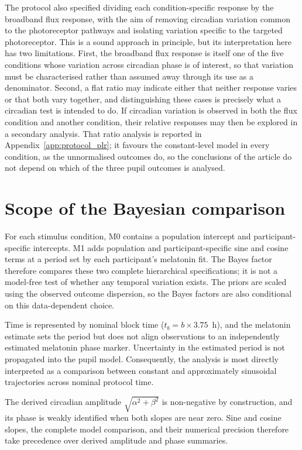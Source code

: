 \begin{appendixbox}
The protocol also specified dividing each condition-specific response by the broadband flux response, with the aim of removing circadian variation common to the photoreceptor pathways and isolating variation specific to the targeted photoreceptor. This is a sound approach in principle, but its interpretation here has two limitations.
First, the broadband flux response is itself one of the five conditions whose variation across circadian phase is of interest, so that variation must be characterised rather than assumed away through its use as a denominator.
Second, a flat ratio may indicate either that neither response varies or that both vary together, and distinguishing these cases is precisely what a circadian test is intended to do.
If circadian variation is observed in both the flux condition and another condition, their relative responses may then be explored in a secondary analysis. That ratio analysis is reported in Appendix~\ref{app:protocol_plr}; it favours the constant-level model in every condition, as the unnormalised outcomes do, so the conclusions of the article do not depend on which of the three pupil outcomes is analysed.

\section{Scope of the Bayesian comparison}

For each stimulus condition, M0 contains a population intercept and participant-specific intercepts. M1 adds population and participant-specific sine and cosine terms at a period set by each participant's melatonin fit. The Bayes factor therefore compares these two complete hierarchical specifications; it is not a model-free test of whether any temporal variation exists. The priors are scaled using the observed outcome dispersion, so the Bayes factors are also conditional on this data-dependent choice.

Time is represented by nominal block time ($t_b=b\times3.75$~h), and the melatonin estimate sets the period but does not align observations to an independently estimated melatonin phase marker. Uncertainty in the estimated period is not propagated into the pupil model. Consequently, the analysis is most directly interpreted as a comparison between constant and approximately sinusoidal trajectories across nominal protocol time.

The derived circadian amplitude $\sqrt{\alpha^2+\beta^2}$ is non-negative by construction, and its phase is weakly identified when both slopes are near zero. Sine and cosine slopes, the complete model comparison, and their numerical precision therefore take precedence over derived amplitude and phase summaries.
\end{appendixbox}

